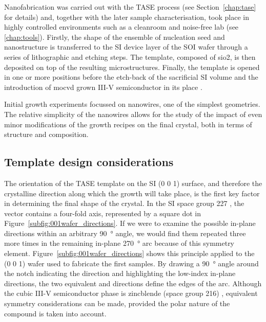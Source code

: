 Nanofabrication was carried out with the \acs{TASE} process (see Section~\ref{chap:tase} for details) and, together with the later sample characterisation, took place in highly controlled environments such as a cleanroom and noise-free lab (see \autoref{chap:tools}). Firstly, the shape of the ensemble of nucleation seed and nanostructure is transferred to the \acl{SI} device layer of the \acs{SOI} wafer through a series of lithographic and etching steps. The template, composed of \acs{sio2}, is then deposited on top of the resulting microstructures. Finally, the template is opened in one or more positions before the etch-back of the sacrificial \acl{SI} volume and the introduction of \acf{mocvd} grown III-V semiconductor in its place \cite{Schmid2015, borgTASEp2018}.

Initial growth experiments focussed on nanowires, one of the simplest geometries. The relative simplicity of the nanowires allows for the study of the impact of even minor modifications of the growth recipes on the final crystal, both in terms of structure and composition.

\subsection{Template design considerations}

The orientation of the \acs{TASE} template on the \acl{SI} \hkl(0 0 1) surface, and therefore the crystalline direction along which the growth will take place, is the first key factor in determining the final shape of the crystal. In the \acl{SI} space group \num{227} \cite{osti_si}, the  vector contains a four-fold axis, represented by a square dot in Figure~\ref{subfig:001wafer_directions}. If we were to examine the possible in-plane directions within an arbitrary \qty{90}{\degree} angle, we would find them repeated three more times in the remaining in-plane \qty{270}{\degree} arc because of this symmetry element. Figure~\ref{subfig:001wafer_directions} shows this principle applied to the \hkl(0 0 1) wafer used to fabricate the first samples. By drawing a \qty{90}{\degree} angle around the notch indicating the \hkl[1 1 0] direction and highlighting the low-index in-plane directions, the two equivalent \hkl[0 1 0] and \hkl[1 0 0] directions define the edges of the arc. Although the cubic III-V semiconductor phase is zincblende (space group \num{216}) \cite{wyckoff1963crystal, osti_gaas_zb, osti_inas_zb, osti_inp_zb}, equivalent symmetry considerations can be made, provided the polar nature of the compound is taken into account.

